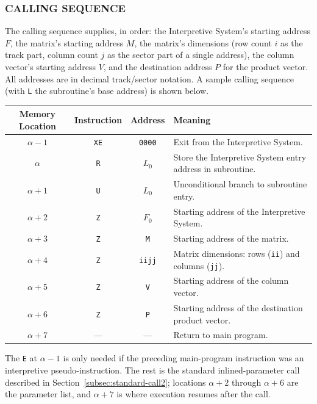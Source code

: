 \subsubsection*{CALLING SEQUENCE}
The calling sequence supplies, in order: the Interpretive System's starting address $F$, the matrix's starting address $M$, the matrix's dimensions (row count $i$ as the track part, column count $j$ as the sector part of a single address), the column vector's starting address $V$, and the destination address $P$ for the product vector. All addresses are in decimal track/sector notation. A sample calling sequence (with \texttt{L} the subroutine's base address) is shown below.

\medskip
\begin{table}[h!]
\centering
\begin{tabularx}{\textwidth}{cccX}
\toprule
\textbf{Memory Location} & \textbf{Instruction} & \textbf{Address} & \textbf{Meaning} \\
\midrule
$\alpha - 1$      & \texttt{XE}     & \texttt{0000}    & Exit from the Interpretive System. \\
$\alpha$          & \texttt{R}      & \texttt{$L_0$}   & Store the Interpretive System entry address in subroutine. \\
$\alpha + 1$      & \texttt{U}      & \texttt{$L_0$}   & Unconditional branch to subroutine entry. \\
$\alpha + 2$      & \texttt{Z}      & \texttt{$F_0$}   & Starting address of the Interpretive System. \\
$\alpha + 3$      & \texttt{Z}      & \texttt{M}       & Starting address of the matrix. \\
$\alpha + 4$      & \texttt{Z}      & \texttt{iijj}    & Matrix dimensions: rows (\texttt{ii}) and columns (\texttt{jj}). \\
$\alpha + 5$      & \texttt{Z}      & \texttt{V}       & Starting address of the column vector. \\
$\alpha + 6$      & \texttt{Z}      & \texttt{P}       & Starting address of the destination product vector. \\
$\alpha + 7$      & ---              & ---              & Return to main program. \\
\bottomrule
\end{tabularx}
\end{table}

\medskip
\noindent
The \texttt{E} at $\alpha-1$ is only needed if the preceding main-program instruction was an interpretive pseudo-instruction. The rest is the standard inlined-parameter call described in Section~\ref{subsec:standard-call2}; locations $\alpha+2$ through $\alpha+6$ are the parameter list, and $\alpha+7$ is where execution resumes after the call.

